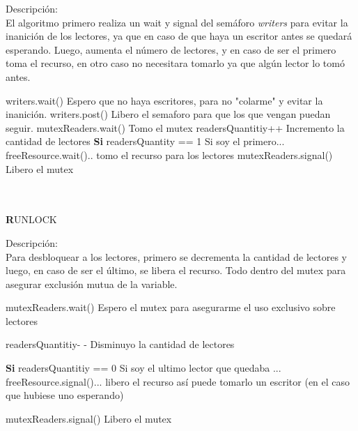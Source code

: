 Descripción:\\
El algoritmo primero realiza un wait y signal del semáforo \textit{writers} para evitar la inanición de los lectores, ya que en caso de que haya un escritor antes se quedará esperando.
Luego, aumenta el número de lectores, y en caso de ser el primero toma el recurso, en otro caso no necesitara tomarlo ya que algún lector lo tomó antes. 
\begin{codebox}
\li	writers.wait()			\RComment Espero que no haya escritores, para no "colarme" y evitar la inanición.
\li	writers.post()			\RComment Libero el semaforo para que los que vengan puedan seguir.
\li	mutexReaders.wait()		\RComment Tomo el mutex
\li	readersQuantitiy++		\RComment Incremento la cantidad de lectores
\li	\textbf{Si} readersQuantity == 1 \Do	\RComment Si soy el primero... 
\li		freeResource.wait()\End	\RComment .. tomo el recurso para los lectores
\li	mutexReaders.signal()		\RComment Libero el mutex
\end{codebox}
\mbox{}\\\mbox{}\\
\textbf RUNLOCK

Descripción:\\
Para desbloquear a los lectores, primero se decrementa la cantidad de lectores y luego, en caso de ser el último, se libera el recurso. Todo dentro del mutex para asegurar exclusión mutua de la variable.
\begin{codebox}

\li	mutexReaders.wait() \RComment Espero el mutex para asegurarme el uso exclusivo sobre lectores

\li	readersQuantitiy- - \RComment Disminuyo la cantidad de lectores

\li	\textbf{Si} readersQuantitiy == 0 \Do \RComment Si soy el ultimo lector que quedaba ... 
\li	freeResource.signal()\End  \RComment ... libero el recurso así puede tomarlo un escritor (en el caso que hubiese uno esperando)

\li	mutexReaders.signal() \RComment Libero el mutex
\end{codebox}
